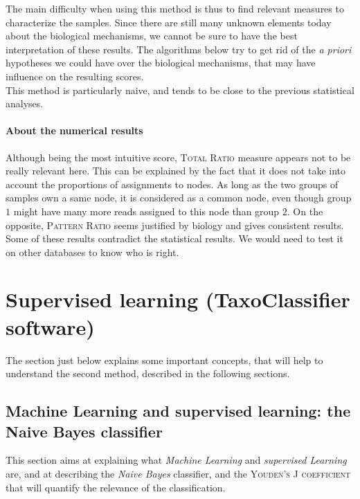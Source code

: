 \documentclass{report}
\begin{document}
The main difficulty when using this method is thus to find relevant measures to characterize the samples. Since there are still many unknown elements today about the biological mechanisms, we cannot be sure to have the best interpretation of these results. The algorithms below try to get rid of the \emph{a priori} hypotheses we could have over the biological mechanisms, that may have influence on the resulting scores.\\

This method is particularly naive, and tends to be close to the previous statistical analyses.\\

\subsubsection{About the numerical results}

Although being the most intuitive score, \textsc{Total Ratio} measure appears not to be really relevant here. This can be explained by the fact that it does not take into account the proportions of assignments to nodes. As long as the two groups of samples own a same node, it is considered as a common node, even though group $1$ might have many more reads assigned to this node than group $2$. On the opposite, \textsc{Pattern Ratio} seems justified by biology and gives consistent results.\\

Some of these results contradict the statistical results. We would need to test it on other databases to know who is right.\\

\chapter{Supervised learning (TaxoClassifier software)}

The section just below explains some important concepts, that will help to understand the second method, described in the following sections. 

\section{Machine Learning and supervised learning: the Naive Bayes classifier}

This section aims at explaining what \emph{Machine Learning} and \emph{supervised Learning} are, and at describing the \emph{Naive Bayes} classifier, and the \textsc{Youden's J coefficient} that will quantify the relevance of the classification.
\end{document}
